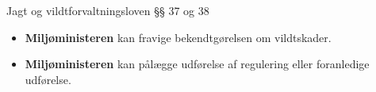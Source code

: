 \begin{frame}{Jagt og vildtforvaltningsloven §§ 37 og 38}
\vspace{1em}

\small

\raggedright

\begin{itemize}

\itemsep0.6em %

\item \textbf{Miljøministeren} kan fravige bekendtgørelsen om vildtskader.

\item \textbf{Miljøministeren} kan pålægge udførelse af regulering eller foranledige udførelse.

\end{itemize}

\end{frame}